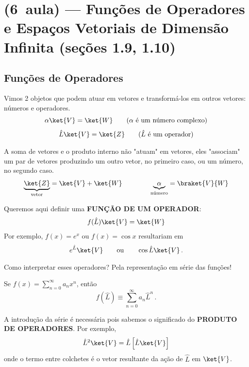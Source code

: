 \section*{(6\textordfeminine\ aula) --- Funções de Operadores e Espaços Vetoriais de Dimensão Infinita (seções 1.9, 1.10)}

\subsection*{Funções de Operadores}

Vimos 2 objetos que podem atuar em vetores e transformá-los em outros vetores: números e operadores.
\begin{equation}
    \alpha \ket{V} = \ket{W} \qquad \text{($\alpha$ é um número complexo)}
\end{equation}
\begin{equation}
    \hat{L}\ket{V} = \ket{Z} \qquad \text{($\hat{L}$ é um operador)}
\end{equation}

A soma de vetores e o produto interno não "atuam" em vetores, eles "associam" um par de vetores produzindo um outro vetor, no primeiro caso, ou um número, no segundo caso.
\begin{equation}
    \underbrace{\ket{Z}}_{\text{vetor}} = \ket{V} + \ket{W} \qquad\qquad \underbrace{\alpha}_{\text{número}} = \braket{V}{W}
\end{equation}

Queremos aqui definir uma \textbf{FUNÇÃO DE UM OPERADOR}:
\begin{equation}
    f(\hat{L})\ket{V} = \ket{W}
\end{equation}
Por exemplo, $f(x) = e^x$ ou $f(x) = \cos x$ resultariam em
\begin{equation}
    e^{\hat{L}}\ket{V} \qquad \text{ou} \qquad \cos\hat{L}\ket{V} \, .
\end{equation}

Como interpretar esses operadores? Pela representação em série das funções!

Se $f(x) = \displaystyle\sum_{n=0}^{\infty} a_n x^n$, então
\begin{equation}
    f(\hat{L}) \equiv \sum_{n=0}^{\infty} a_n \hat{L}^n \, .
\end{equation}

A introdução da série é necessária pois sabemos o significado do \textbf{PRODUTO DE OPERADORES}. Por exemplo,
\begin{equation}
    \hat{L}^2 \ket{V} = \hat{L}\left[\hat{L}\ket{V}\right]
\end{equation}
onde o termo entre colchetes é o vetor resultante da ação de $\hat{L}$ em $\ket{V}$.

